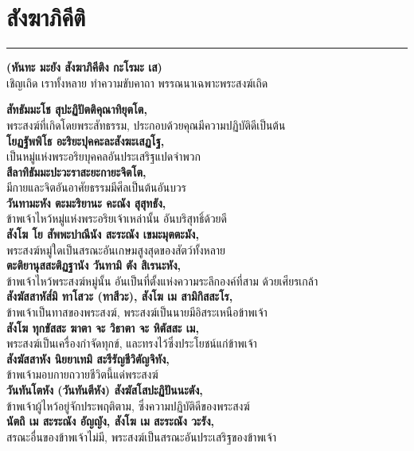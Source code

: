\documentclass[12pt]{article}
\begin{document}
\section{สังฆาภิคีติ}
\hrule
\begin{center}
\textbf{(หันทะ มะยัง สังฆาภิคีติง กะโรมะ เส)}\\
เชิญเถิด เราทั้งหลาย ทำความขับคาถา พรรณนาเฉพาะพระสงฆ์เถิด
\end{center}
\textbf{สัทธัมมะโช สุปะฏิปัตติคุณาทิยุตโต,}\\
\indent พระสงฆ์ที่เกิดโดยพระสัทธรรม, ประกอบด้วยคุณมีความปฏิบัติดีเป็นต้น\\
\textbf{โยฏฐัพพิโธ อะริยะปุคคะละสังฆะเสฏโฐ,}\\
\indent เป็นหมู่แห่งพระอริยบุคคลอันประเสริฐแปดจำพวก\\
\textbf{สีลาทิธัมมะปะวะราสะยะกายะจิตโต,}\\
\indent มีกายและจิตอันอาศัยธรรมมีศีลเป็นต้นอันบวร\\
\textbf{วันทามะหัง ตะมะริยานะ คะณัง สุสุทธัง,}\\
\indent ข้าพเจ้าไหว้หมู่แห่งพระอริยเจ้าเหล่านั้น อันบริสุทธิ์ด้วยดี\\
\textbf{สังโฆ โย สัพพะปาณีนัง สะระณัง เขมะมุตตะมัง,}\\
\indent พระสงฆ์หมู่ใดเป็นสรณะอันเกษมสูงสุดของสัตว์ทั้งหลาย\\
\textbf{ตะติยานุสสะติฏฐานัง วันทามิ ตัง สิเรนะหัง,}\\
\indent ข้าพเจ้าไหว้พระสงฆ์หมู่นั้น อันเป็นที่ตั้งแห่งความระลึกองค์ที่สาม ด้วยเศียรเกล้า\\
\textbf{สังฆัสสาหัส๎มิ ทาโสวะ (ทาสีวะ), สังโฆ เม สามิกิสสะโร,}\\
\indent ข้าพเจ้าเป็นทาสของพระสงฆ์, พระสงฆ์เป็นนายมีอิสระเหนือข้าพเจ้า\\
\textbf{สังโฆ ทุกขัสสะ ฆาตา จะ วิธาตา จะ หิตัสสะ เม,}\\
\indent พระสงฆ์เป็นเครื่องกำจัดทุกข์, และทรงไว้ซึ่งประโยชน์แก่ข้าพเจ้า\\
\textbf{สังฆัสสาหัง นิยยาเทมิ สะรีรัญชีวิตัญจิทัง,}\\
\indent ข้าพเจ้ามอบกายถวายชีวิตนี้แด่พระสงฆ์\\
\textbf{วันทันโตหัง (วันทันตีหัง) สังฆัสโสปะฏิปันนะตัง,}\\
\indent ข้าพเจ้าผู้ไหว้อยู่จักประพฤติตาม, ซึ่งความปฏิบัติดีของพระสงฆ์\\
\textbf{นัตถิ เม สะระณัง อัญญัง, สังโฆ เม สะระณัง วะรัง,}\\
\indent สรณะอื่นของข้าพเจ้าไม่มี, พระสงฆ์เป็นสรณะอันประเสริฐของข้าพเจ้า\\
\end{document}
